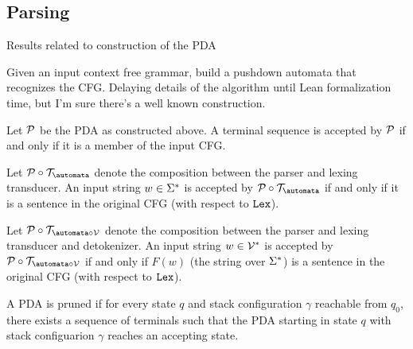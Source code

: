 \subsection{Parsing}
Results related to construction of the PDA
\begin{definition}[Parser]
    \label{def:Parser}
    Given an input context free grammar, build a pushdown automata that recognizes the CFG. Delaying details of the algorithm until Lean formalization time, but I'm sure there's a well known construction.
\end{definition}

\begin{theorem} 
    \label{thm:ParserEquivCFG}
    Let $\mathcal{P}$ be the PDA as constructed above. A terminal sequence is accepted by $\mathcal{P}$ if and only if it is a member of the input CFG.
\end{theorem}

\begin{theorem} 
    \label{thm:ParserLexerEquivCFGSentences}
    Let $\pushdown \circ \transducer_{\automata}$ denote the composition between the parser and lexing transducer.
    An input string $w \in \Sigma^{*}$ is accepted by $\pushdown \circ \transducer_{\automata}$ if and only if it is a sentence in the original CFG (with respect to $\mathtt{Lex}$).
\end{theorem}

\begin{theorem} 
    \label{thm:ParserLexerDetokenizerEquivCFGSentences}
    Let $\pushdown \circ \transducer_{\automata \circ \vocab}$ denote the composition between the parser and lexing transducer and detokenizer.
    An input string $w \in \mathcal{V}^{*}$ is accepted by $\pushdown \circ \transducer_{\automata \circ \vocab}$ if and only if $F(w)$ (the string over $\Sigma^{*}$) is a sentence in the original CFG (with respect to $\mathtt{Lex}$).
\end{theorem}

\begin{definition}
    \label{def:PDAPruned}
    A PDA is pruned if for every state $q$ and stack configuration $\gamma$ reachable from $q_0$, there exists a sequence of terminals such that the PDA starting in state $q$ with stack configuarion $\gamma$ reaches an accepting state.
\end{definition}

